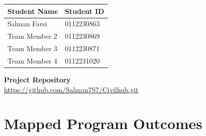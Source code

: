 \documentclass[12pt,a4paper]{article}
\begin{document}
\begin{titlepage}
    \vspace{0.6cm}

    \begin{center}
    \renewcommand{\arraystretch}{1.2}
    \begin{tabular}{|p{6.5cm}|p{4.0cm}|}
    \hline
    \textbf{Student Name} & \textbf{Student ID} \\
    \hline
    Salman Farsi & 0112230863 \\
    Team Member 2 & 0112230869 \\
    Team Member 3 & 0112230871 \\
    Team Member 4 & 0112231020 \\
    \hline
    \end{tabular}
    \end{center}

    \vfill

    {\textbf{Project Repository}}\\[0.2em]
    \url{https://github.com/Salman7S7/Civilhub.git}

    \vspace{0.5cm}
\end{titlepage}

\newpage
{}
\tableofcontents

\newpage
\section*{Mapped Program Outcomes}
\end{document}
